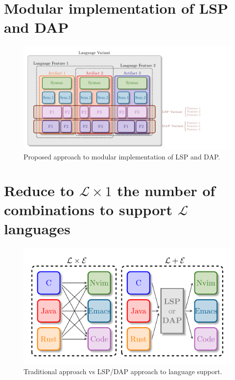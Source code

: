 \section{Modular implementation of LSP and DAP}\label{sec:concept:ModularImplementationOfLSPAndDAP}

\begin{figure}[t]
    \centering
    \includegraphics[width=0.9\linewidth]{figs/concept/module_with_lsp.pdf}
    \caption{Proposed approach to modular implementation of LSP and DAP.}
    \label{lst:concept:module_with_lsp}
\end{figure}


\section{Reduce to $\mathcal{L} \times 1$ the number of combinations to support $\mathcal{L}$ languages}

\begin{figure}[t]
    \centering
    \includegraphics[width=0.9\linewidth]{figs/concept/lsp_combinations.pdf}
    \caption{Traditional approach vs LSP/DAP approach to language support.}
    \label{lst:conept:lsp_combinations}
\end{figure}


